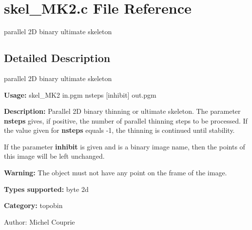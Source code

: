 \section{skel\_\-MK2.c File Reference}
\label{skel__MK2_8c}
parallel 2D binary ultimate skeleton  




\label{_details}
\subsection{Detailed Description}
parallel 2D binary ultimate skeleton 

{\bf Usage:} skel\_\-MK2 in.pgm nsteps [inhibit] out.pgm

{\bf Description:} Parallel 2D binary thinning or ultimate skeleton. The parameter {\bf nsteps} gives, if positive, the number of parallel thinning steps to be processed. If the value given for {\bf nsteps} equals -1, the thinning is continued until stability.

If the parameter {\bf inhibit} is given and is a binary image name, then the points of this image will be left unchanged.

{\bf Warning:} The object must not have any point on the frame of the image.

{\bf Types supported:} byte 2d

{\bf Category:} topobin

\begin{Desc}
\item[Author:]Michel Couprie \end{Desc}
